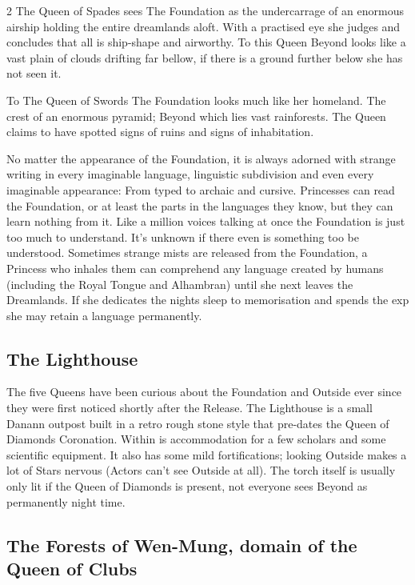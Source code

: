 \begin{multicols}{2}
The Queen of Spades sees The Foundation as the undercarrage of an enormous airship holding the entire dreamlands aloft. With a practised eye she judges and concludes that all is ship-shape and airworthy. To this Queen Beyond looks like a vast plain of clouds drifting far bellow, if there is a ground further below she has not seen it.

To The Queen of Swords The Foundation looks much like her homeland. The crest of an enormous pyramid; Beyond which lies vast rainforests. The Queen claims to have spotted signs of ruins and signs of inhabitation. 

\bigsidebarend

No matter the appearance of the Foundation, it is always adorned with strange writing in every imaginable language, linguistic subdivision and even every imaginable appearance: From typed to archaic and cursive. Princesses can read the Foundation, or at least the parts in the languages they know, but they can learn nothing from it. Like a million voices talking at once the Foundation is just too much to understand. It's unknown if there even is something too be understood. Sometimes strange mists are released from the Foundation, a Princess who inhales them can comprehend any language created by humans (including the Royal Tongue and Alhambran) until she next leaves the Dreamlands. If she dedicates the nights sleep to memorisation and spends the exp she may retain a language permanently. 

\subsection*{The Lighthouse}
The five Queens have been curious about the Foundation and Outside ever since they were first noticed shortly after the Release. The Lighthouse is a small Danann outpost built in a retro rough stone style that pre-dates the Queen of Diamonds Coronation. Within is accommodation for a few scholars and some scientific equipment. It also has some mild fortifications; looking Outside makes a lot of Stars nervous (Actors can't see Outside at all). The torch itself is usually only lit if the Queen of Diamonds is present, not everyone sees Beyond as permanently night time. 

\subsection*{The Forests of Wen-Mung, domain of the Queen of Clubs}


\end{multicols}
